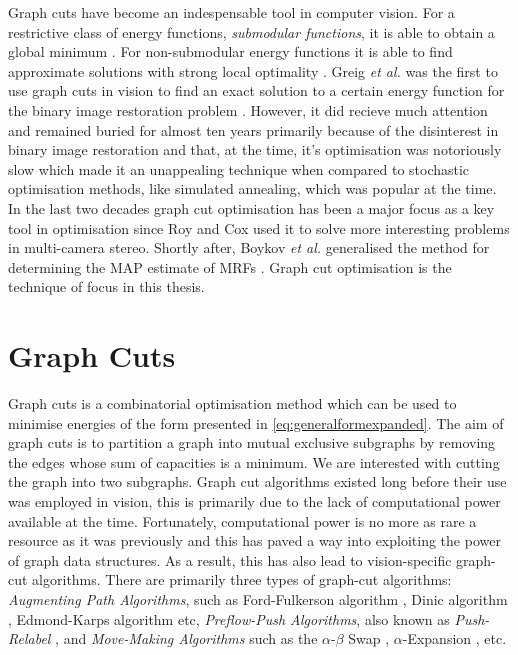 \begin{definition}
	Graph cuts have become an indespensable tool in computer vision.
	For a restrictive class of energy functions, \textit{submodular functions}, it is able to obtain a global minimum \citep{Kolmogorov2004,Boykov2001_2,Boykvo2001_3,Kolmogorov2007}.
	For non-submodular energy functions it is able to find approximate solutions with strong local optimality \citep{Boykov2001,Kohli2009,Komodakis2007,Kumar2009}.
	Greig \textit{et al.} was the first to use graph cuts in vision to find an exact solution to a certain energy function for the binary image restoration problem \citep{Greig1989}.
	However, it did recieve much attention and remained buried for almost ten years primarily because of the disinterest in binary image restoration and that, at the time, it's optimisation was notoriously slow which made it an unappealing technique when compared to stochastic optimisation methods, like simulated annealing, which was popular at the time.
	In the last two decades graph cut optimisation has been a major focus as a key tool in optimisation since Roy and Cox \citep{Roy1998} used it to solve more interesting problems in multi-camera stereo.
	Shortly after, Boykov \textit{et al.} generalised the method for determining the MAP estimate of MRFs \citep{Boykov1998}.
	Graph cut optimisation is the technique of focus in this thesis.
\end{definition}
  

\section{Graph Cuts}
\label{sec:GraphCuts}

Graph cuts is a combinatorial optimisation method which can be used to minimise energies of the form presented in \autoref{eq:generalformexpanded}. The aim of graph cuts is to partition a graph into mutual exclusive subgraphs by removing the edges whose sum of capacities is a minimum. We are interested with cutting the graph into two subgraphs. Graph cut algorithms existed long before their use was employed in vision, this is primarily due to the lack of computational power available at the time. Fortunately, computational power is no more as rare a resource as it was previously and this has paved a way into exploiting the power of graph data structures. As a result, this has also lead to vision-specific graph-cut algorithms. There are primarily three types of graph-cut algorithms: \textit{Augmenting Path Algorithms}, such as Ford-Fulkerson algorithm \citep{Ford1956}, Dinic algorithm \citep{Dinic1970}, Edmond-Karps algorithm \citep{Edmonds1972} etc, \textit{Preflow-Push Algorithms}, also known as \textit{Push-Relabel} \citep{Goldberg1988}, and \textit{Move-Making Algorithms} such as the $\alpha$-$\beta$ Swap \citep{Boykov2001}, $\alpha$-Expansion \citep{Boykov2001}, etc.


